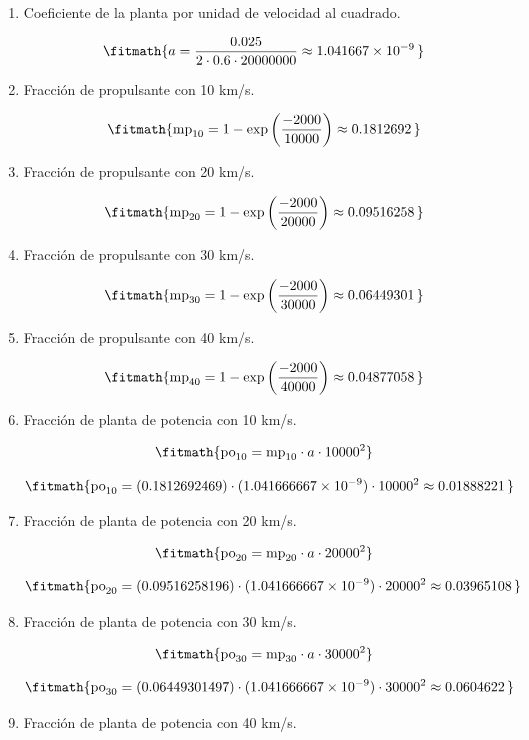 \begin{enumerate}

\item Coeficiente de la planta por unidad de velocidad al cuadrado.

\[\fitmath{a=\frac{0.025}{2\cdot 0.6\cdot 20000000}\approx 1.041667\times10^{-9}\,}\]

\item Fracción de propulsante con 10 km/s.

\[\fitmath{\mathrm{mp}_{10}=1-\exp\left(\frac{-2000}{10000}\right)\approx 0.1812692\,}\]

\item Fracción de propulsante con 20 km/s.

\[\fitmath{\mathrm{mp}_{20}=1-\exp\left(\frac{-2000}{20000}\right)\approx 0.09516258\,}\]

\item Fracción de propulsante con 30 km/s.

\[\fitmath{\mathrm{mp}_{30}=1-\exp\left(\frac{-2000}{30000}\right)\approx 0.06449301\,}\]

\item Fracción de propulsante con 40 km/s.

\[\fitmath{\mathrm{mp}_{40}=1-\exp\left(\frac{-2000}{40000}\right)\approx 0.04877058\,}\]

\item Fracción de planta de potencia con 10 km/s.

\[\fitmath{\mathrm{po}_{10}=\mathrm{mp}_{10}\cdot a\cdot {10000}^{2}}\]

\[\fitmath{\mathrm{po}_{10}=(0.1812692469)\cdot (1.041666667\times10^{-9})\cdot {10000}^{2}\approx 0.01888221\,}\]

\item Fracción de planta de potencia con 20 km/s.

\[\fitmath{\mathrm{po}_{20}=\mathrm{mp}_{20}\cdot a\cdot {20000}^{2}}\]

\[\fitmath{\mathrm{po}_{20}=(0.09516258196)\cdot (1.041666667\times10^{-9})\cdot {20000}^{2}\approx 0.03965108\,}\]

\item Fracción de planta de potencia con 30 km/s.

\[\fitmath{\mathrm{po}_{30}=\mathrm{mp}_{30}\cdot a\cdot {30000}^{2}}\]

\[\fitmath{\mathrm{po}_{30}=(0.06449301497)\cdot (1.041666667\times10^{-9})\cdot {30000}^{2}\approx 0.0604622\,}\]

\item Fracción de planta de potencia con 40 km/s.


\end{enumerate}

